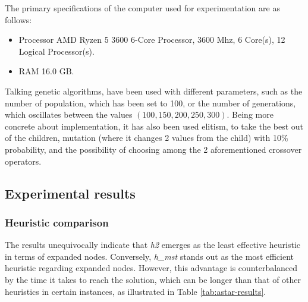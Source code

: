 \documentclass[runningheads]{llncs}
\begin{document}
The primary specifications of the computer used for experimentation are as follows:
\begin{itemize}
    \item Processor	AMD Ryzen 5 3600 6-Core Processor, 3600 Mhz, 6 Core(s), 12 Logical Processor(s).
    \item RAM 16.0 GB.
\end{itemize}

Talking genetic algorithms, have been used with different parameters, such as the number of population, which has been set to 100, or the number of generations, which oscillates between the values $(100, 150, 200, 250, 300)$. Being more concrete about implementation, it has also been used elitism, to take the best out of the children, mutation (where it changes 2 values from the child) with 10\% probability, and the possibility of choosing among the 2 aforementioned crossover operators.

\subsection{Experimental results}
\subsubsection{Heuristic comparison} 
The results unequivocally indicate that \textit{h2} emerges as the least effective heuristic in terms of expanded nodes. Conversely, \textit{h\_mst} stands out as the most efficient heuristic regarding expanded nodes. However, this advantage is counterbalanced by the time it takes to reach the solution, which can be longer than that of other heuristics in certain instances, as illustrated in Table \ref{tab:astar-results}.
\end{document}
